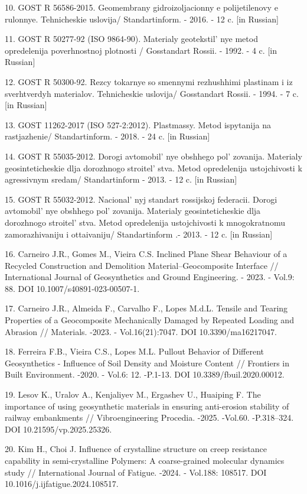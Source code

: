 \begin{refs}
10. GOST R 56586-2015. Geomembrany gidroizoljacionny e polijetilenovy e
rulonnye. Tehnicheskie uslovija/ Standartinform. - 2016. - 12 c. {[}in
Russian{]}

11. GOST R 50277-92 (ISO 9864-90). Materialy
geotekstil' nye metod opredelenija poverhnostnoj
plotnosti / Gosstandart Rossii. - 1992. - 4 c. {[}in Russian{]}

12. GOST R 50300-92. Rezcy tokarnye so smennymi rezhushhimi plastinam i
iz sverhtverdyh materialov. Tehnicheskie uslovija/ Gosstandart Rossii. -
1994. - 7 c. {[}in Russian{]}

13. GOST 11262-2017 (ISO 527-2:2012). Plastmassy. Metod ispytanija na
rastjazhenie/ Standartinform. - 2018. - 24 c. {[}in Russian{]}

14. GOST R 55035-2012. Dorogi avtomobil' nye obshhego
pol' zovanija. Materialy geosinteticheskie dlja
dorozhnogo stroitel' stva. Metod opredelenija
ustojchivosti k agressivnym sredam/ Standartinform - 2013. - 12 c. {[}in
Russian{]}

15. GOST R 55032-2012. Nacional' nyj standart rossijskoj
federacii. Dorogi avtomobil' nye obshhego
pol' zovanija. Materialy geosinteticheskie dlja
dorozhnogo stroitel' stva. Metod opredelenija
ustojchivosti k mnogokratnomu zamorazhivaniju i ottaivaniju/
Standartinform .- 2013. - 12 c. {[}in Russian{]}

16. Carneiro J.R., Gomes M., Vieira C.S. Inclined Plane Shear Behaviour
of a Recycled Construction and Demolition Material--Geocomposite
Interface // International Journal of Geosynthetics and Ground
Engineering. - 2023. - Vol.9: 88. DOI 10.1007/s40891-023-00507-1.

17. Carneiro J.R., Almeida F., Carvalho F., Lopes M.d.L. Tensile and
Tearing Properties of a Geocomposite Mechanically Damaged by Repeated
Loading and Abrasion // Materials. -2023. - Vol.16(21):7047. DOI
10.3390/ma16217047.

18. Ferreira F.B., Vieira C.S., Lopes M.L. Pullout Behavior of Different
Geosynthetics - Influence of Soil Density and Moisture Content //
Frontiers in Built Environment. -2020. - Vol.6: 12. -P.1-13. DOI
10.3389/fbuil.2020.00012.

19. Lesov K., Uralov A., Kenjaliyev M., Ergashev U., Huaiping F. The
importance of using geosynthetic materials in ensuring anti-erosion
stability of railway embankments // Vibroengineering Procedia. -2025.
-Vol.60. -P.318--324. DOI 10.21595/vp.2025.25326.

20. Kim H., Choi J. Influence of crystalline structure on creep
resistance capability in semi-crystalline Polymers: A coarse-grained
molecular dynamics study // International Journal of Fatigue. -2024. -
Vol.188: 108517. DOI 10.1016/j.ijfatigue.2024.108517.


\end{refs}

